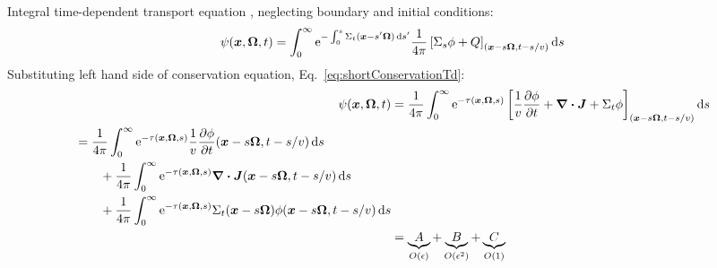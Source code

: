 \documentclass{beamer}
\begin{document}
\begin{frame}
  Integral time-dependent transport equation \cite{Pri2010}, neglecting
  boundary and initial conditions:
  \begin{equation} \label{eq:integralAngularFluxShortened}
    \psi(\bm{x}, \bm{\Omega}, t) = 
    \int_{0}^{\infty}
    \mathop{}\!\mathrm{e}^{ - \int_{0}^{s} \Sigma_t(\bm{x}-s'\bm{\Omega}) \mathop{}\!\mathrm{d} s'}
    \frac{1}{4\pi}
    \left[ \Sigma_s \phi + Q \right]_{(\bm{x} - s \bm{\Omega}, t-s/v)}
    \mathop{}\!\mathrm{d} s
  \end{equation}
  Substituting left hand side of conservation equation,
  Eq.~\eqref{eq:shortConservationTd}:
  \begin{align*}
    \psi(\vec{x}, \vec{\Omega}, t) &= 
    \frac{1}{4\pi} \int_{0}^{\infty}
    \eexp^{ - \tau(\vec{x},\vec{\Omega},s)}
       \left[ \frac1v\pder{\phi}{t} + \del \vd \vec{J}
    + \Sigma_t \phi\right]_{(\vec{x} - s \vec{\Omega}, t-s/v)}
    \ud s
    \\
    \begin{split}
    &= 
    \frac{1}{4\pi} \int_{0}^{\infty} \eexp^{ - \tau(\vec{x},\vec{\Omega},s)}
    \frac1v\pder{\phi}{t}(\vec{x} - s \vec{\Omega}, t-s/v) \ud s
    \\&\qquad + 
    \frac{1}{4\pi} \int_{0}^{\infty} \eexp^{ - \tau(\vec{x},\vec{\Omega},s)}
    \del \vd \vec{J}(\vec{x} - s \vec{\Omega}, t-s/v) \ud s
    \\&\qquad +
    \frac{1}{4\pi} \int_{0}^{\infty} \eexp^{ - \tau(\vec{x},\vec{\Omega},s)}
    \Sigma_t(\vec{x} - s \vec{\Omega}) \phi(\vec{x} - s \vec{\Omega}, t-s/v)
    \ud s
    \end{split}
    \\
    &=
    \underbrace{A}_{O(\epsilon)} + 
    \underbrace{B}_{O(\epsilon^2)} + 
    \underbrace{C}_{O(1)}
  \end{align*}
\end{frame}
\end{document}

